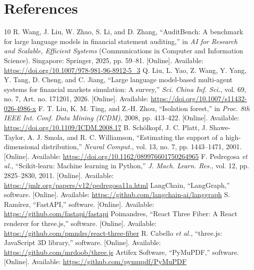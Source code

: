 \documentclass[11pt,a4paper]{article}
\begin{document}
\section*{References}
\sloppy
\begin{thebibliography}{10}
 R. Wang, J. Liu, W. Zhao, S. Li, and D. Zhang, ``AuditBench: A benchmark for large language models in financial statement auditing,'' in \textit{AI for Research and Scalable, Efficient Systems} (Communications in Computer and Information Science). Singapore: Springer, 2025, pp. 59--81. [Online]. Available: \url{https://doi.org/10.1007/978-981-96-8912-5_3}
 Q. Liu, L. Yao, Z. Wang, Y. Yang, Y. Tang, D. Cheng, and C. Jiang, ``Large language model-based multi-agent systems for financial markets simulation: A survey,'' \textit{Sci. China Inf. Sci.}, vol. 69, no. 7, Art. no. 171201, 2026. [Online]. Available: \url{https://doi.org/10.1007/s11432-026-4986-x}
 F. T. Liu, K. M. Ting, and Z.-H. Zhou, ``Isolation forest,'' in \textit{Proc. 8th IEEE Int. Conf. Data Mining (ICDM)}, 2008, pp. 413--422. [Online]. Available: \url{https://doi.org/10.1109/ICDM.2008.17}
 B. Sch\"{o}lkopf, J. C. Platt, J. Shawe-Taylor, A. J. Smola, and R. C. Williamson, ``Estimating the support of a high-dimensional distribution,'' \textit{Neural Comput.}, vol. 13, no. 7, pp. 1443--1471, 2001. [Online]. Available: \url{https://doi.org/10.1162/089976601750264965}
 F. Pedregosa \textit{et al.}, ``Scikit-learn: Machine learning in Python,'' \textit{J. Mach. Learn. Res.}, vol. 12, pp. 2825--2830, 2011. [Online]. Available: \url{https://jmlr.org/papers/v12/pedregosa11a.html}
 LangChain, ``LangGraph,'' software. [Online]. Available: \url{https://github.com/langchain-ai/langgraph}
 S. Ram\'{i}rez, ``FastAPI,'' software. [Online]. Available: \url{https://github.com/fastapi/fastapi}
 Poimandres, ``React Three Fiber: A React renderer for three.js,'' software. [Online]. Available: \url{https://github.com/pmndrs/react-three-fiber}
 R. Cabello \textit{et al.}, ``three.js: JavaScript 3D library,'' software. [Online]. Available: \url{https://github.com/mrdoob/three.js}
 Artifex Software, ``PyMuPDF,'' software. [Online]. Available: \url{https://github.com/pymupdf/PyMuPDF}
\end{thebibliography}
\end{document}
